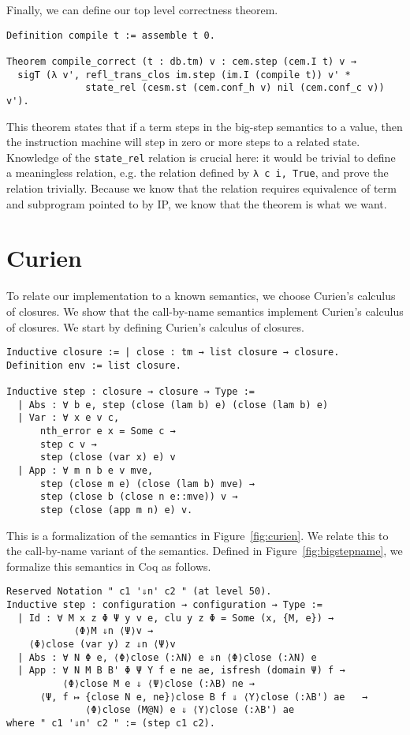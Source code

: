 Finally, we can define our top level correctness theorem.

\begin{verbatim}
Definition compile t := assemble t 0.

Theorem compile_correct (t : db.tm) v : cem.step (cem.I t) v → 
  sigT (λ v', refl_trans_clos im.step (im.I (compile t)) v' *
              state_rel (cesm.st (cem.conf_h v) nil (cem.conf_c v)) v').
\end{verbatim}
This theorem states that if a term steps in the big-step semantics to a value,
then the instruction machine will step in zero or more steps to a related state.
Knowledge of the \texttt{state\_rel} relation is crucial here: it would be
trivial to define a meaningless relation, e.g. the relation defined by
\texttt{λ c i, True}, and prove the relation trivially. Because we know that
the relation requires equivalence of term and subprogram pointed to by IP, we
know that the theorem is what we want.

\section{Curien}

To relate our implementation to a known semantics, we choose Curien's calculus
of closures. We show that the call-by-name \ce semantics implement Curien's
calculus of closures. We start by defining Curien's calculus of closures. 

\begin{verbatim}
Inductive closure := | close : tm → list closure → closure. 
Definition env := list closure.

Inductive step : closure → closure → Type := 
  | Abs : ∀ b e, step (close (lam b) e) (close (lam b) e)
  | Var : ∀ x e v c, 
      nth_error e x = Some c → 
      step c v → 
      step (close (var x) e) v
  | App : ∀ m n b e v mve, 
      step (close m e) (close (lam b) mve) → 
      step (close b (close n e::mve)) v → 
      step (close (app m n) e) v.
\end{verbatim}

This is a formalization of the semantics in Figure~\ref{fig:curien}. We relate
this to the call-by-name variant of the \ce semantics. Defined in
Figure~\ref{fig:bigstepname}, we formalize this semantics in Coq as follows.

\begin{verbatim}
Reserved Notation " c1 '⇓n' c2 " (at level 50).
Inductive step : configuration → configuration → Type :=
  | Id : ∀ M x z Φ Ψ y v e, clu y z Φ = Some (x, {M, e}) → 
            ⟨Φ⟩M ⇓n ⟨Ψ⟩v →
    ⟨Φ⟩close (var y) z ⇓n ⟨Ψ⟩v
  | Abs : ∀ N Φ e, ⟨Φ⟩close (:λN) e ⇓n ⟨Φ⟩close (:λN) e
  | App : ∀ N M B B' Φ Ψ Υ f e ne ae, isfresh (domain Ψ) f → 
          ⟨Φ⟩close M e ⇓ ⟨Ψ⟩close (:λB) ne → 
      ⟨Ψ, f ↦ {close N e, ne}⟩close B f ⇓ ⟨Υ⟩close (:λB') ae   →
              ⟨Φ⟩close (M@N) e ⇓ ⟨Υ⟩close (:λB') ae
where " c1 '⇓n' c2 " := (step c1 c2).
\end{verbatim}

